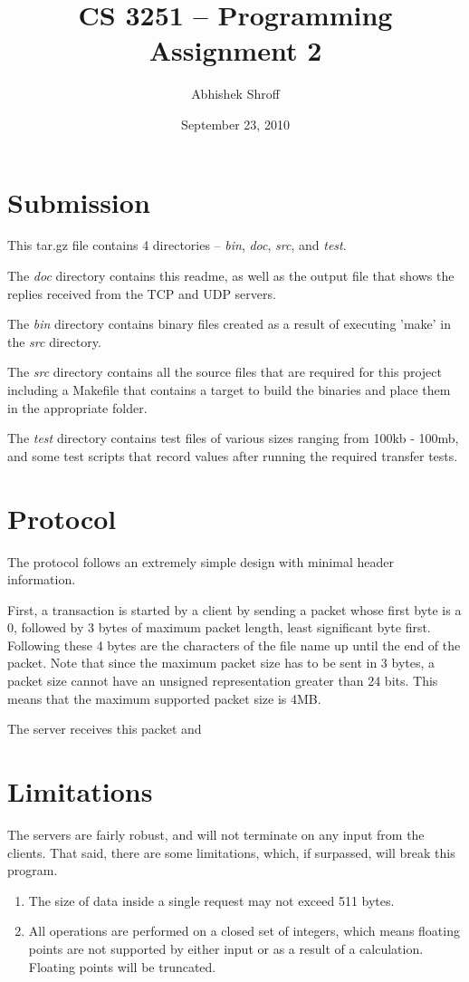 \documentclass[12pt]{article}
\begin{document}
\title{CS 3251 -- Programming Assignment 2}
\author{Abhishek Shroff}
\date{September 23, 2010}
\maketitle

\section{Submission}
This tar.gz file contains 4 directories -- \emph{bin}, \emph{doc}, \emph{src}, and \emph{test}.

The \emph{doc} directory contains this readme, as well as the output file that shows the replies received from the TCP and UDP servers.

The \emph{bin} directory contains binary files created as a result of executing 'make' in the \emph{src} directory.

The \emph{src} directory contains all the source files that are required for this project including a Makefile that contains a target to build the binaries and place them in the appropriate folder.

The \emph{test} directory contains test files of various sizes ranging from 100kb - 100mb, and some test scripts that record values after running the required transfer tests.

\section{Protocol}
The protocol follows an extremely simple design with minimal header information.

First, a transaction is started by a client by sending a packet whose first byte is a 0, followed by 3 bytes of maximum packet length, least significant byte first. Following these 4 bytes are the characters of the file name up until the end of the packet. Note that since the maximum packet size has to be sent in 3 bytes, a packet size cannot have an unsigned representation greater than 24 bits. This means that the maximum supported packet size is 4MB.

The server receives this packet and
\section{Limitations}
The servers are fairly robust, and will not terminate on any input from the clients. That said, there are some limitations, which, if surpassed, will break this program.
\begin{enumerate}
\item The size of data inside a single request may not exceed 511 bytes.
\item All operations are performed on a closed set of integers, which means floating points are not supported by either input or as a result of a calculation. Floating points will be truncated.
\end{enumerate}
\end{document}
